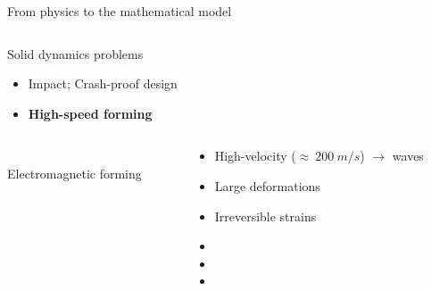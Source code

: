 \begin{withoutheadline}
  \begin{frame}{From physics to the mathematical model}
    
  \vspace{-0.6cm}
  \begin{overprint}
    
    \begin{columns}
      \begin{column}{0.45\textwidth}
        \begin{block}{Solid dynamics problems}
          \begin{itemize}
          \item[] Impact; Crash-proof design
          \item[] \textbf{High-speed forming}
          \end{itemize}
        \end{block}
      \end{column}
      
      \begin{column}{0.55\textwidth}
      \end{column}
    \end{columns}

    
    \begin{columns}
      \begin{column}{0.45\textwidth}
        \centering
        \\
    \scriptsize Electromagnetic forming \cite{Guillaume}
      \end{column}
      \begin{column}{0.45\textwidth}
        \begin{block}{}
          \begin{footnotesize}
            \begin{itemize}
            \item High-velocity ($\approx \: 200\:m/s$) $\rightarrow$ waves
            \item Large deformations
            \item Irreversible strains
            \item[]
            \item[]
            \item[]
            \end{itemize}
          \end{footnotesize}
        \end{block}  
      \end{column}
    \end{columns}
    

\end{overprint}
\end{frame}
\end{withoutheadline}
